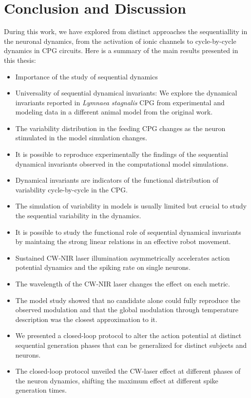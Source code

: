 \chapter{Conclusion and Discussion} %
\label{c-conclusion}

During this work, we have explored from distinct approaches the sequentiallity in the neuronal dynamics, from the activation of ionic channels to cycle-by-cycle dynamics in CPG circuits. Here is a summary of the main results presented in this thesis:

\begin{itemize}
	\item Importance of the study of sequential dynamics
	\item Universality of sequential dynamical invariants: We explore the dynamical invariants reported in \textit{Lymnaea stagnalis} CPG from experimental and modeling data in a different animal model from the original work. 
	\item The variability distribution in the feeding CPG changes as the neuron stimulated in the model simulation changes.
	\item It is possible to reproduce experimentally the findings of the sequential dynamical invariants observed in the computational model simulations.
	\item Dynamical invariants are indicators of the functional distribution of variability cycle-by-cycle in the CPG. 
	\item The simulation of variability in models is usually limited but crucial to study the sequential variability in the dynamics. 
	\item It is possible to study the functional role of sequential dynamical invariants by maintaing the strong linear relations in an effective robot movement.
	\item Sustained CW-NIR laser illumination asymmetrically accelerates action potential dynamics and the spiking rate on single neurons. 
	\item The wavelength of the CW-NIR laser changes the effect on each metric. 
	\item The model study showed that no candidate alone could fully reproduce the observed modulation and that the global modulation through temperature description was the closest approximation to it.
	\item We presented a closed-loop protocol to alter the action potential at distinct sequential generation phases that can be generalized for distinct subjects and neurons.
	\item The closed-loop protocol unveiled the CW-laser effect at different phases of the neuron dynamics, shifting the maximum effect at different spike generation times.
\end{itemize}


